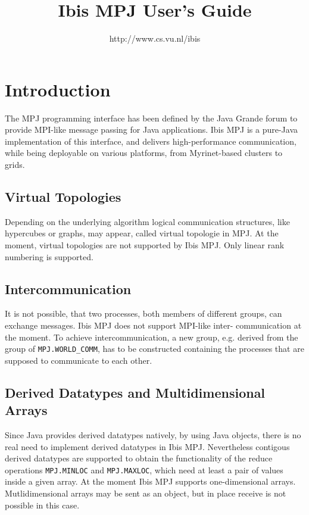 \documentclass[a4paper,10pt]{article}
\begin{document}
\title{Ibis MPJ User's Guide}

\author{http://www.cs.vu.nl/ibis}

\maketitle

\section{Introduction}

The MPJ programming interface has been defined by the Java Grande forum to
provide MPI-like message passing for Java applications. Ibis MPJ is a
pure-Java implementation of this interface, and delivers high-performance
communication, while being deployable on various platforms,
from Myrinet-based clusters to grids.

\subsection{Virtual Topologies}

Depending on the underlying algorithm logical communication structures, 
like hypercubes or graphs, may appear, called virtual topologie in MPJ. 
At the moment, virtual topologies are not supported by Ibis MPJ. Only
linear rank numbering is supported.

\subsection{Intercommunication}

It is not possible, that two processes, both members of different groups, 
can exchange messages. Ibis MPJ does not support MPI-like inter- 
communication at the moment. To achieve intercommunication, a new group, 
e.g. derived from the group of \texttt{MPJ.WORLD\_COMM}, has to be constructed 
containing the processes that are supposed to communicate to each other.

\subsection{Derived Datatypes and Multidimensional Arrays}

Since Java provides derived datatypes natively, by using Java objects, 
there is no real need to implement derived datatypes in Ibis MPJ. 
Nevertheless contigous derived datatypes are supported to obtain the 
functionality of the reduce operations \texttt{MPJ.MINLOC}
and \texttt{MPJ.MAXLOC}, which 
need at least a pair of values inside a given array. At the moment 
Ibis MPJ supports one-dimensional arrays. Mutlidimensional arrays may 
be sent as an object, but in place receive is not possible in this case.
\end{document}
